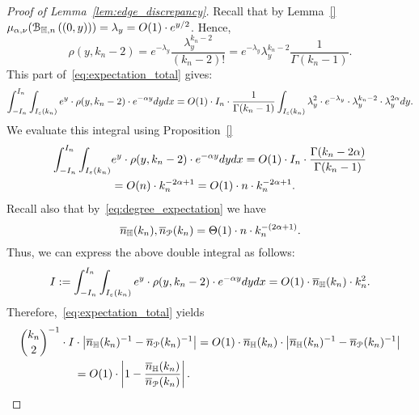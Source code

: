 \begin{proof}[Proof of Lemma~\ref{lem:edge_discrepancy}]
Recall that by Lemma~\ref{} $\mu_{\alpha,\nu} ({\mathcal B}_{\mathbb{H},n}\left((0,y)\right)) = \lambda_y = O(1) \cdot e^{y/2}$. 
Hence, 
$$\rho(y,k_n-2)= e^{-\lambda_y} \frac{\lambda_y^{k_n-2}}{(k_n-2)!}  
= e^{-\lambda_y} \lambda_y^{k_n-2} \frac{1}{\Gamma (k_n-1)}.  
$$
This part of~\eqref{eq:expectation_total} gives: 
\begin{equation*} 
\int_{-I_n}^{I_n} \int_{I_\varepsilon (k_n)}
e^y \cdot \rho(y,k_n-2) \cdot e^{-\alpha y}dy dx  
= O(1) \cdot  I_n \cdot \frac{1}{\Gamma (k_n-1)} 
\int_{I_\varepsilon (k_n)} \lambda_y^2  \cdot e^{-\lambda_y} \cdot \lambda_y^{k_n-2} \cdot \lambda_y^{2\alpha}  dy. 
\end{equation*}
We evaluate this integral using Proposition~\ref{}
\begin{equation*} 
\begin{split}
\int_{-I_n}^{I_n} \int_{I_\varepsilon (k_n)} &
e^{y} \cdot \rho(y,k_n-2) \cdot  e^{-\alpha y}dy dx  
= O(1) \cdot  I_n \cdot \frac{\Gamma (k_n-2\alpha)}{\Gamma (k_n-1)}  \\
& =O(n) \cdot k_n^{-2\alpha+1} = O(1)\cdot n \cdot k_n^{-2\alpha+1}. 
\end{split}
\end{equation*}
Recall also that by~\eqref{eq:degree_expectation} we have 
$$ \overline{n}_{\mathbb{H}}(k_n), \overline{n}_{{\mathcal P}}(k_n) = \Theta (1) \cdot n \cdot k_n^{-(2\alpha +1)}.$$
Thus, we can express the above double integral as follows: 
\begin{equation*}
I:=\int_{-I_n}^{I_n} \int_{I_\varepsilon (k_n)} 
e^{y} \cdot \rho(y,k_n-2) \cdot  e^{-\alpha y}dy dx   
= O(1) \cdot \overline{n}_{\mathbb{H}}(k_n) \cdot k_n^2.
\end{equation*}
Therefore,~\eqref{eq:expectation_total} yields 
\begin{equation*} 
\begin{split}
{k_n \choose 2}^{-1}\cdot I & \cdot \left| \overline{n}_{\mathbb{H}}(k_n)^{-1} - \overline{n}_{{\mathcal P}}(k_n)^{-1} \right| = O(1) \cdot \overline{n}_{\mathbb{H}}(k_n)   \cdot \left| \overline{n}_{\mathbb{H}}(k_n)^{-1} - \overline{n}_{{\mathcal P}}(k_n)^{-1} \right| \\
& =O(1) \cdot \left| 1 - \frac{\overline{n}_{\mathbb{H}}(k_n)}{\overline{n}_{{\mathcal P}}(k_n)} \right|.
\end{split}
\end{equation*}

\end{proof}
